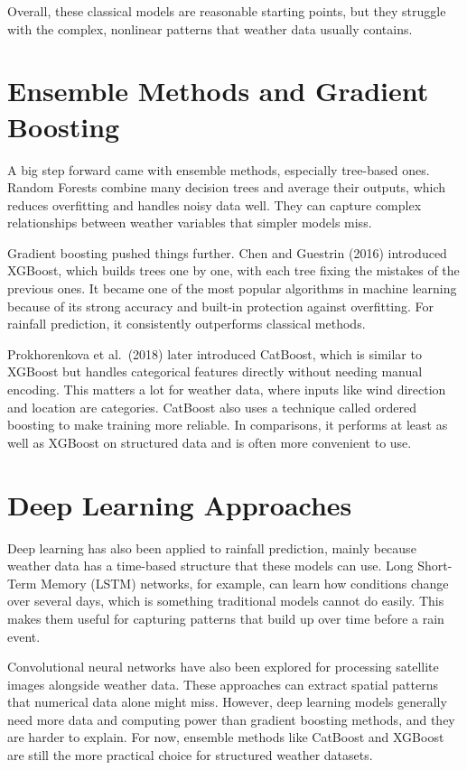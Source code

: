 \documentclass[12pt,a4paper]{article}
\begin{document}
Overall, these classical models are reasonable starting points, but they struggle with the complex, nonlinear patterns that weather data usually contains.

\section*{Ensemble Methods and Gradient Boosting}

A big step forward came with ensemble methods, especially tree-based ones. Random Forests combine many decision trees and average their outputs, which reduces overfitting and handles noisy data well. They can capture complex relationships between weather variables that simpler models miss.

Gradient boosting pushed things further. Chen and Guestrin (2016) introduced XGBoost, which builds trees one by one, with each tree fixing the mistakes of the previous ones. It became one of the most popular algorithms in machine learning because of its strong accuracy and built-in protection against overfitting. For rainfall prediction, it consistently outperforms classical methods.

Prokhorenkova et al.\ (2018) later introduced CatBoost, which is similar to XGBoost but handles categorical features directly without needing manual encoding. This matters a lot for weather data, where inputs like wind direction and location are categories. CatBoost also uses a technique called ordered boosting to make training more reliable. In comparisons, it performs at least as well as XGBoost on structured data and is often more convenient to use.

\section*{Deep Learning Approaches}

Deep learning has also been applied to rainfall prediction, mainly because weather data has a time-based structure that these models can use. Long Short-Term Memory (LSTM) networks, for example, can learn how conditions change over several days, which is something traditional models cannot do easily. This makes them useful for capturing patterns that build up over time before a rain event.

Convolutional neural networks have also been explored for processing satellite images alongside weather data. These approaches can extract spatial patterns that numerical data alone might miss. However, deep learning models generally need more data and computing power than gradient boosting methods, and they are harder to explain. For now, ensemble methods like CatBoost and XGBoost are still the more practical choice for structured weather datasets.
\end{document}
